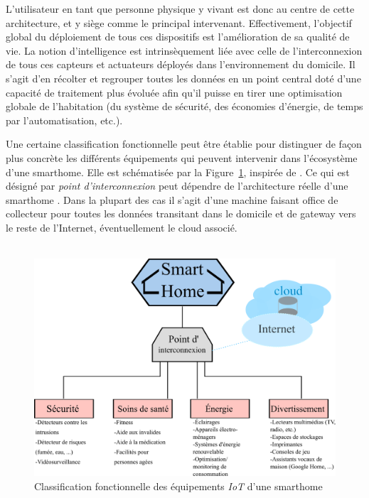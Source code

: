 \documentclass[]{article}
\begin{document}
\par L'utilisateur en tant que personne physique y vivant est donc au centre de cette architecture, et y siège comme le principal intervenant. Effectivement, l'objectif global du déploiement de tous ces dispositifs est l'amélioration de sa qualité de vie. La notion d'intelligence est intrinsèquement liée avec celle de l'interconnexion de tous ces capteurs et actuateurs déployés dans l'environnement du domicile. Il s'agit d'en récolter et regrouper toutes les données en un point central doté d'une capacité de traitement plus évoluée afin qu'il puisse en tirer une optimisation globale de l'habitation (du système de sécurité, des économies d'énergie, de temps par l'automatisation, etc.).\\

\par Une certaine classification fonctionnelle peut être établie pour distinguer de façon plus concrète les différents équipements qui peuvent intervenir dans l'écosystème d'une smarthome. Elle est schématisée par la Figure~\ref{sm_class}, inspirée de \cite{Basman2016}. Ce qui est désigné par \textit{point d'interconnexion} peut dépendre de l'architecture réelle d'une smarthome \cite{Huichen2016}. Dans la plupart des cas il s'agit d'une machine faisant office de collecteur pour toutes les données transitant dans le domicile et de gateway vers le reste de l'Internet, éventuellement le cloud associé.\\

~\\

\begin{figure}[!h]
\centering
\includegraphics[scale=1.4]{smarthome_class.png}
\caption{Classification fonctionnelle des équipements \textit{IoT} d'une smarthome}
\label{sm_class}
\end{figure}
\end{document}
